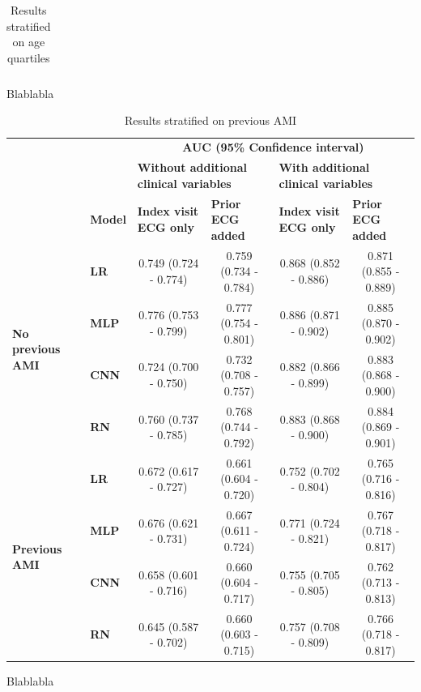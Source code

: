 \documentclass[preprint]{elsarticle}
\begin{document}
\begin{table}[H]
\begin{adjustbox}{center}
\begin{tabular}{@{}llcccc@{}}
\bottomrule
\end{tabular}
\end{adjustbox}
\caption{Results stratified on age quartiles}
\medskip
\small
Blablabla
\label{table:appendix:age}
\end{table}
\renewcommand{\arraystretch}{1}



\renewcommand{\arraystretch}{1.2}
\begin{table}[H]
  \centering
  \scriptsize
\begin{adjustbox}{center}
\begin{tabular}{@{}llcccc@{}}
  \toprule
  & & \multicolumn{4}{c}{\textbf{AUC (95\% Confidence interval)}} \\
  \cmidrule(lr){3-6}
  & & \multicolumn{2}{l}{\textbf{Without additional clinical variables}} & \multicolumn{2}{l}{\textbf{With additional clinical variables}} \\
  \cmidrule(lr){3-4}\cmidrule(lr){5-6}
  & \multicolumn{1}{l}{\textbf{Model}} & \multicolumn{1}{l}{\textbf{Index visit ECG only}} & \multicolumn{1}{l}{\textbf{Prior ECG added}} & \multicolumn{1}{l}{\textbf{Index visit ECG only}} & \multicolumn{1}{l}{\textbf{Prior ECG added}} \\
  \midrule

\multirow{4}{*}{\begin{minipage}{0.65in}\textbf{No previous AMI}\end{minipage}} %
& \textbf{LR} & 0.749 (0.724 - 0.774) & 0.759 (0.734 - 0.784) & 0.868 (0.852 - 0.886) & 0.871 (0.855 - 0.889) \\
& \textbf{MLP} & 0.776 (0.753 - 0.799) & 0.777 (0.754 - 0.801) & 0.886 (0.871 - 0.902) & 0.885 (0.870 - 0.902) \\
& \textbf{CNN} & 0.724 (0.700 - 0.750) & 0.732 (0.708 - 0.757) & 0.882 (0.866 - 0.899) & 0.883 (0.868 - 0.900) \\
& \textbf{RN} & 0.760 (0.737 - 0.785) & 0.768 (0.744 - 0.792) & 0.883 (0.868 - 0.900) & 0.884 (0.869 - 0.901) \\
  \cmidrule(lr){1-2}
\multirow{4}{*}{\begin{minipage}{0.65in}\textbf{Previous AMI}\end{minipage}} %
& \textbf{LR} & 0.672 (0.617 - 0.727) & 0.661 (0.604 - 0.720) & 0.752 (0.702 - 0.804) & 0.765 (0.716 - 0.816) \\
& \textbf{MLP} & 0.676 (0.621 - 0.731) & 0.667 (0.611 - 0.724) & 0.771 (0.724 - 0.821) & 0.767 (0.718 - 0.817) \\
& \textbf{CNN} & 0.658 (0.601 - 0.716) & 0.660 (0.604 - 0.717) & 0.755 (0.705 - 0.805) & 0.762 (0.713 - 0.813) \\
& \textbf{RN} & 0.645 (0.587 - 0.702) & 0.660 (0.603 - 0.715) & 0.757 (0.708 - 0.809) & 0.766 (0.718 - 0.817) \\

\bottomrule
\end{tabular}
\end{adjustbox}
\caption{Results stratified on previous AMI}
\medskip
\small
Blablabla
\label{table:appendix:ami}
\end{table}
\end{document}
